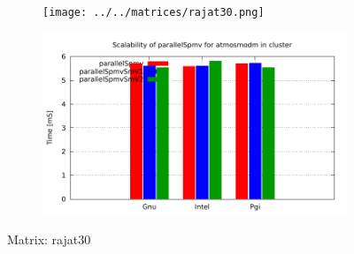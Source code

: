 \begin{figure} [ht!]
    \centering
    \captionsetup{justification=centering, singlelinecheck=false}
    \begin{subfigure}{.65\textwidth}
      \centering
      \hspace*{-3.5cm} 
      \texttt{[image: ../../matrices/rajat30.png]}
      \label{fig:rajat30_matrix}
    \end{subfigure}%
    \begin{subfigure}{.65\textwidth}
      \centering
      \hspace*{-6.0cm} 
      \includegraphics[page=5, width=0.95\linewidth]{../plots/myCluster_4-2.pdf}
      \label{fig:rajat30_performance}
    \end{subfigure}
\caption{Matrix: rajat30}
\label{fig:rajat30}
\end{figure}



